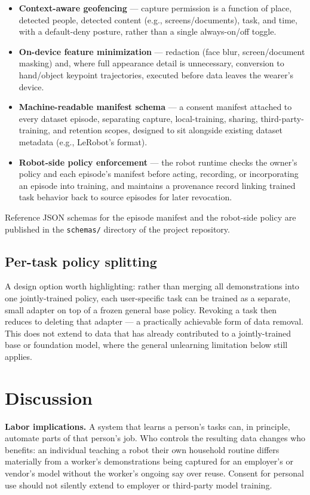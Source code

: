 \documentclass[10pt,twocolumn,letterpaper]{article}
\begin{document}
\begin{itemize}
  \item \textbf{Context-aware geofencing} — capture permission is a function of place, detected people, detected content (e.g., screens/documents), task, and time, with a default-deny posture, rather than a single always-on/off toggle.
  \item \textbf{On-device feature minimization} — redaction (face blur, screen/document masking) and, where full appearance detail is unnecessary, conversion to hand/object keypoint trajectories, executed before data leaves the wearer's device.
  \item \textbf{Machine-readable manifest schema} — a consent manifest attached to every dataset episode, separating capture, local-training, sharing, third-party-training, and retention scopes, designed to sit alongside existing dataset metadata (e.g., LeRobot's format).
  \item \textbf{Robot-side policy enforcement} — the robot runtime checks the owner's policy and each episode's manifest before acting, recording, or incorporating an episode into training, and maintains a provenance record linking trained task behavior back to source episodes for later revocation.
\end{itemize}

Reference JSON schemas for the episode manifest and the robot-side policy are published in the \texttt{schemas/} directory of the project repository.

\subsection{Per-task policy splitting}

A design option worth highlighting: rather than merging all demonstrations into one jointly-trained policy, each user-specific task can be trained as a separate, small adapter on top of a frozen general base policy. Revoking a task then reduces to deleting that adapter — a practically achievable form of data removal. This does not extend to data that has already contributed to a jointly-trained base or foundation model, where the general unlearning limitation below still applies.

\section{Discussion}

\textbf{Labor implications.} A system that learns a person's tasks can, in principle, automate parts of that person's job. Who controls the resulting data changes who benefits: an individual teaching a robot their own household routine differs materially from a worker's demonstrations being captured for an employer's or vendor's model without the worker's ongoing say over reuse. Consent for personal use should not silently extend to employer or third-party model training.
\end{document}
